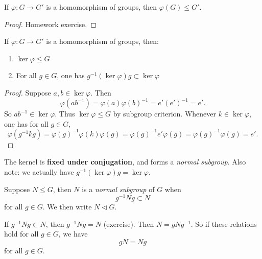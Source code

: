 
\begin{lemma}
	If $\varphi:G \to  G'$ is a homomorphism of groups, then $\varphi(G)\le G'$.
\end{lemma}
\begin{proof}
	Homework exercise.
\end{proof}

\begin{theorem}
	If $\varphi:G \to G'$ is a homomorphism of groups, then: 
	\begin{enumerate}
		\item $\operatorname{ker} \varphi \le G$
		\item For all $g \in G$, one has $g^{-1} \left( \operatorname{ker} \varphi \right) g \subset \operatorname{ker} \varphi$
	\end{enumerate}
\end{theorem}
\begin{proof}
	Suppose $a,b \in \operatorname{ker} \varphi$. Then \[
		\varphi(ab^{-1} )=\varphi(a)\varphi(b)^{-1} = e' (e')^{-1} = e'
	.\] 
	So $ab^{-1}  \in \operatorname{ker} \varphi$. Thus $\operatorname{ker} \varphi \le G$ by subgroup criterion.
	Whenever $k \in \operatorname{ker} \varphi$, one has for all $g \in G$, \[
		\varphi(g^{-1} kg) = \varphi(g)^{-1} \varphi(k)\varphi(g) = \varphi(g)^{-1} e' \varphi(g) = \varphi(g)^{-1} \varphi(g) = e'
	.\] 
\end{proof}

\begin{remark}
	The kernel is \textbf{fixed under conjugation}, and forms a \textit{normal subgroup}. Also note: we actually have $g^{-1} \left( \operatorname{ker} \varphi \right) g = \operatorname{ker} \varphi$.
\end{remark}

\begin{definition}
	Suppose $N\le G$, then $N$ is a \textit{normal subgroup} of $G$ when \[
		g^{-1} N g \subset N
	\]
	for all $g \in G$. We then write $N \triangleleft  G$.
\end{definition}

If $g^{-1} Ng \subset N$, then $g^{-1} Ng = N$ (exercise). Then $N = g N g^{-1}$. So if these relations hold for all $g \in G$, we have \[
	g N = N g
\] for all $g \in G$.

